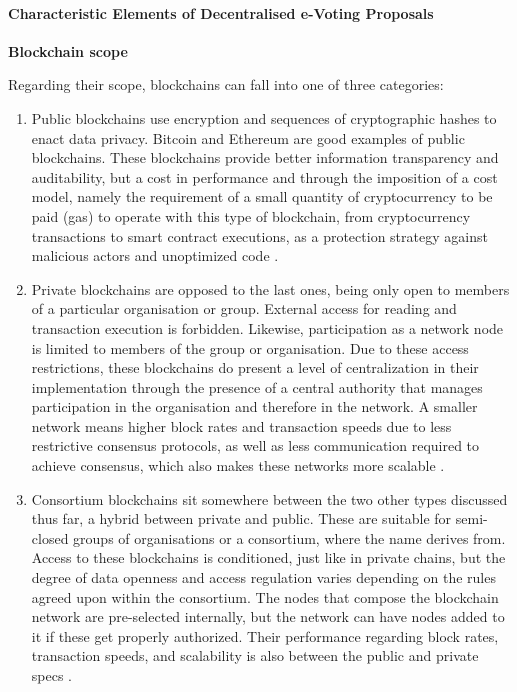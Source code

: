 \documentclass[../access.tex]{subfiles}
\begin{document}
\paragraph{Characteristic Elements of Decentralised e-Voting Proposals}
\par
\textbf{Blockchain scope}
\par
\label{blockchain-type-access-control}
Regarding their scope, blockchains can fall into one of three categories:
\begin{enumerate}
    \item {Public blockchains use encryption and sequences of cryptographic hashes to enact data privacy. Bitcoin and Ethereum are good examples of public blockchains. These blockchains provide better information transparency and auditability, but a cost in performance and through the imposition of a cost model, namely the requirement of a small quantity of cryptocurrency to be paid (gas) to operate with this type of blockchain, from cryptocurrency transactions to smart contract executions, as a protection strategy against malicious actors and unoptimized code \cite{Xu2017}}.

    \item {Private blockchains are opposed to the last ones, being only open to members of a particular organisation or group. External access for reading and transaction execution is forbidden. Likewise, participation as a network node is limited to members of the group or organisation. Due to these access restrictions, these blockchains do present a level of centralization in their implementation through the presence of a central authority that manages participation in the organisation and therefore in the network. A smaller network means higher block rates and transaction speeds due to less restrictive consensus protocols, as well as less communication required to achieve consensus, which also makes these networks more scalable \cite{Viriyasitavat2019}.}

    \item {Consortium blockchains sit somewhere between the two other types discussed thus far, a hybrid between private and public. These are suitable for semi-closed groups of organisations or a consortium, where the name derives from. Access to these blockchains is conditioned, just like in private chains, but the degree of data openness and access regulation varies depending on the rules agreed upon within the consortium. The nodes that compose the blockchain network are pre-selected internally, but the network can have nodes added to it if these get properly authorized. Their performance regarding block rates, transaction speeds, and scalability is also between the public and private specs \cite{Xinyi2018}}.
\end{enumerate}
\end{document}
